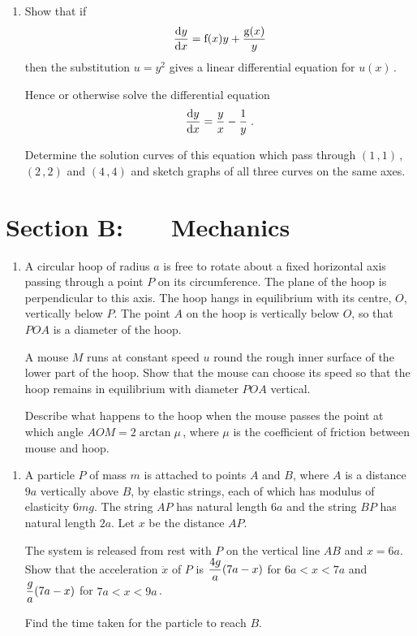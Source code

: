 \documentclass[a4, 11pt]{report}
\newlength{\qspace}
\newcounter{qnumber}
\newenvironment{question}%
 {\vspace{\qspace}
  \begin{enumerate}[\bfseries 1\quad][10]%
    \setcounter{enumi}{\value{qnumber}}%
    \item%
 }
{
  \end{enumerate}
  \filbreak
  \stepcounter{qnumber}
 }
\def\g{{\mathrm g}}
\def\f{{\mathrm f}}
\newcommand{\ds}{\displaystyle}
\begin{document}
\begin{question}	
 Show that if
\[
{\mathrm{d}y \over \mathrm{d} x}=\f(x)y + {\g(x) \over y}
\]
then the substitution $u = y^2$ gives a linear differential equation for $u(x)\,$.

Hence or otherwise solve the differential equation
\[
{\mathrm{d}y \over \mathrm{d} x}={y \over x} - {1 \over y}\;.
\]

Determine the solution curves of 
this equation which pass through 
$(1 \,,  1)\,$, $(2\, ,  2)$ and 
$(4 \, , 4)$ and sketch graphs of all three curves on the same axes.
\end{question}	
		

		
	
\newpage
\section*{Section B: \ \ \ Mechanics}


	
\begin{question}
A circular hoop of radius $a$ is free to rotate about a fixed horizontal 
axis passing through a point $P$ on its circumference. The plane of the hoop
is perpendicular to this axis. 
The hoop hangs in equilibrium with its centre, $O$, vertically below $P$.
The point $A$ on the hoop is vertically below $O$, so that $POA$ is a diameter of the hoop. 


A mouse $M$ runs at constant speed $u$ round the 
rough inner surface of the lower part of the hoop. 
Show that the mouse can choose its speed so that the hoop 
remains in equilibrium with diameter $POA$ vertical.

Describe what happens to the hoop when the mouse passes the point at which angle 
$AOM =  2 \arctan \mu\,$, 
where $\mu$ is the coefficient of friction between mouse and hoop.
	\end{question}
	
\begin{question}	
A particle $P$ of mass $m$ is attached to points $A$ and $B$, where $A$ is a distance $9a$ 
vertically above $B$, by elastic strings, 
each of which has modulus of elasticity $6mg$. 
The string $AP$ has natural length $6a$ and the string 
$BP$ has natural length $2a$. Let $x$ be the distance $AP$.

The system is released from rest with $P$ 
on the vertical line $AB$ and $x = 6a$. 
Show that the acceleration $\ddot{x}$ of $P$ is 
$\ds{4g \over a}(7a - x)$ for $6a<x<7a$ 
and 
$\ds{g \over a}(7a - x)$ for $7a< x < 9a\,$.

Find the time taken for the particle to reach $B$.
\end{question}
\end{document}
